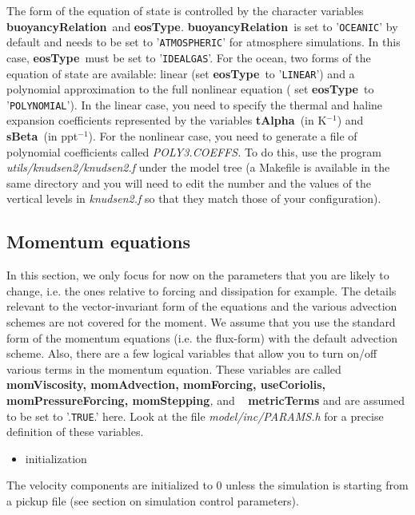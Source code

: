 The form of the equation of state is controlled by the character variables 
\textbf{buoyancyRelation}\textit{\ }and \textbf{eosType}\textit{. }\textbf{%
buoyancyRelation}\textit{\ }is set to '\texttt{OCEANIC}' by default and
needs to be set to '\texttt{ATMOSPHERIC}' for atmosphere simulations. In
this case, \textbf{eosType}\textit{\ }must be set to '\texttt{IDEALGAS}'.
For the ocean, two forms of the equation of state are available: linear (set 
\textbf{eosType}\textit{\ }to '\texttt{LINEAR}') and a polynomial
approximation to the full nonlinear equation ( set \textbf{eosType}\textit{\ 
}to '\texttt{POLYNOMIAL}'). In the linear case, you need to specify the
thermal and haline expansion coefficients represented by the variables 
\textbf{tAlpha}\textit{\ }(in K$^{-1}$) and \textbf{sBeta}\textit{\ }(in ppt$%
^{-1}$). For the nonlinear case, you need to generate a file of polynomial
coefficients called \textit{POLY3.COEFFS. }To do this, use the program 
\textit{utils/knudsen2/knudsen2.f }under the model tree (a Makefile is
available in the same directory and you will need to edit the number and the
values of the vertical levels in \textit{knudsen2.f }so that they match
those of your configuration). \textit{\ }

\subsection{Momentum equations}

In this section, we only focus for now on the parameters that you are likely
to change, i.e. the ones relative to forcing and dissipation for example.
The details relevant to the vector-invariant form of the equations and the
various advection schemes are not covered for the moment. We assume that you
use the standard form of the momentum equations (i.e. the flux-form) with
the default advection scheme. Also, there are a few logical variables that
allow you to turn on/off various terms in the momentum equation. These
variables are called \textbf{momViscosity, momAdvection, momForcing,
useCoriolis, momPressureForcing, momStepping}\textit{, }and \textit{\ }%
\textbf{metricTerms }and are assumed to be set to '.\texttt{TRUE}.' here.
Look at the file \textit{model/inc/PARAMS.h }for a precise definition of
these variables.

\begin{itemize}
\item initialization
\end{itemize}

The velocity components are initialized to 0 unless the simulation is
starting from a pickup file (see section on simulation control parameters).

